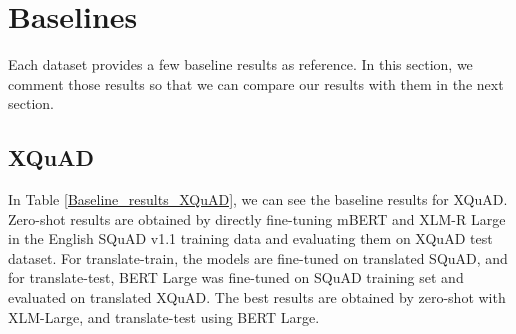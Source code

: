 \documentclass[11pt]{article}
\begin{document}
\section{Baselines}

Each dataset provides a few baseline results as reference. In this section, we comment those results so that we can compare our results with them in the next section.

\subsection{XQuAD}

In Table \ref{Baseline_results_XQuAD}, we can see the baseline results for XQuAD. Zero-shot results are obtained by directly fine-tuning mBERT and XLM-R Large in the English SQuAD v1.1 training data and evaluating them on XQuAD test dataset. For translate-train, the models are fine-tuned on translated SQuAD, and for translate-test, BERT Large was fine-tuned on SQuAD training set and evaluated on translated XQuAD. The best results are obtained by zero-shot with XLM-Large, and translate-test using BERT Large.
\end{document}
